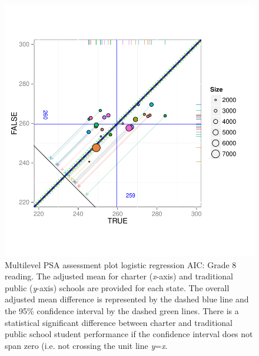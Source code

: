 \begin{figure}[h!]
\begin{center}
\includegraphics[width=\textwidth,trim=0 .6in 0 .6in]{../Figures2009/g8read-mlpsa-lrAIC-circ.pdf}
\caption[Multilevel PSA assessment plot logistic regression AIC: Grade 8 reading]{Multilevel PSA assessment plot logistic regression AIC: Grade 8 reading. The adjusted mean for charter (\textit{x}-axis) and traditional public (\textit{y}-axis) schools are provided for each state. The overall adjusted mean difference is represented by the dashed blue line and the 95\% confidence interval by the dashed green lines. There is a statistical significant difference between charter and traditional public school student performance if the confidence interval does not span zero (i.e. not crossing the unit line \textit{y}=\textit{x}.}
\end{center}
\end{figure}

